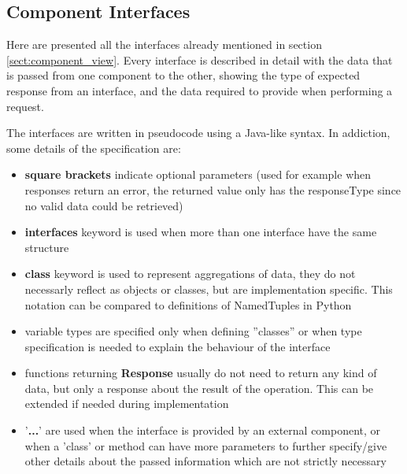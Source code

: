 \clearpage
\subsection{Component Interfaces}
Here are presented all the interfaces already mentioned in section \ref{sect:component_view}. Every interface is described in detail with the data that is passed from one component to the other, showing the type of expected response from an interface, and the data required to provide when performing a request.

The interfaces are written in pseudocode using a Java-like syntax. In addiction, some details of the specification are:
\begin{itemize}
    \item \textbf{square brackets} indicate optional parameters (used for example when responses return an error, the returned value only has the responseType since no valid data could be retrieved)
    \item \textbf{interfaces} keyword is used when more than one interface have the same structure
    \item \textbf{class} keyword is used to represent aggregations of data, they do not necessarly reflect as objects or classes, but are implementation specific. This notation can be compared to definitions of NamedTuples in Python
    \item variable types are specified only when defining ''classes'' or when type specification is needed to explain the behaviour of the interface
    \item functions returning \textbf{Response} usually do not need to return any kind of data, but only a response about the result of the operation. This can be extended if needed during implementation
    \item '\textbf{...}' are used when the interface is provided by an external component, or when a 'class' or method can have more parameters to further specify/give other details about the passed information which are not strictly necessary
\end{itemize}




